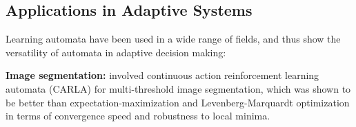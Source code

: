 \documentclass[12pt,oneside]{book}
\begin{document}
%
%
%
%

\subsection{Applications in Adaptive Systems}
\label{subsec:la-applications}

Learning automata have been used in a wide range of fields, and thus show the versatility of automata in adaptive decision making:

\textbf{Image segmentation:} \citet{Cuevas2011} involved continuous action reinforcement learning automata (CARLA) for multi-threshold image segmentation, which was shown to be better than expectation-maximization and Levenberg-Marquardt optimization in terms of convergence speed and robustness to local minima.
\end{document}
